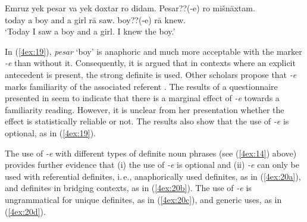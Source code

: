 \documentclass[output=paper]{langsci/langscibook}
\begin{document}
\begin{exe}
\ex\label{4ex:19}
\gll	Emruz yek pesar va   yek doxtar ro	didam.      Pesar??(-e) ro       mišnāxtam. \\
	today a     boy    and a     girl      rā 	saw.{}  boy??(-e)   rā       knew.{} \\
\glt 	`Today I saw a boy and a girl. I knew the boy.'
\end{exe}

In (\ref{4ex:19}), {\emph{pesar}} `boy' is anaphoric and much more acceptable with the marker {\emph{-e}} than without it. Consequently, it is argued that in contexts where an explicit antecedent is present, the strong definite is used. Other scholars propose that {\emph{-e}} marks familiarity of the associated referent \citep{hedberg:etal:09}.  The results of a questionnaire presented in \cite{nikravan:14} seem to indicate that there is a marginal effect of {\emph{-e}} towards a familiarity reading. However, it is unclear from her presentation whether the effect is statistically reliable or not. The results also show that the use of {\emph{-e}} is optional, as in (\ref{4ex:19}).

The use of {\emph{-e}} with different types of definite noun phrases (see (\ref{4ex:14}) above) provides further evidence that (i) the use of {\emph{-e}} is optional and (ii) {\emph{-e}} can only be used with referential definites, i.\,e., anaphorically used definites, as in (\ref{4ex:20a}), and definites in bridging contexts, as in (\ref{4ex:20b}). The use of {\emph{-e}} is ungrammatical for unique definites, as in (\ref{4ex:20c}), and generic uses, as in (\ref{4ex:20d}).
\end{document}
